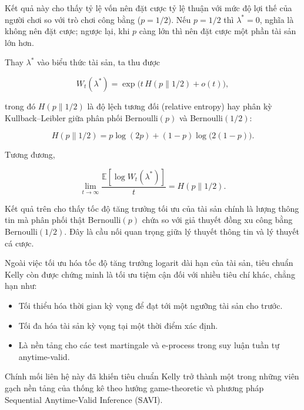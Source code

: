 Kết quả này cho thấy tỷ lệ vốn nên đặt cược tỷ lệ thuận với mức độ lợi thế của người chơi so với trò chơi công bằng ($p=1/2$). Nếu $p=1/2$ thì $\lambda^*=0$, nghĩa là không nên đặt cược; ngược lại, khi $p$ càng lớn thì nên đặt cược một phần tài sản lớn hơn.

Thay $\lambda^*$ vào biểu thức tài sản, ta thu được

\[
W_t(\lambda^*)
=
\exp
\Big(
t\,H(p\|1/2)
+
o(t)
\Big),
\]

trong đó $H(p\|1/2)$ là độ lệch tương đối (relative entropy) hay phân kỳ Kullback--Leibler giữa phân phối Bernoulli$(p)$ và Bernoulli$(1/2)$:

\[
H(p\|1/2)
=
p\log(2p)
+
(1-p)\log\big(2(1-p)\big).
\]

Tương đương,

\[
\lim_{t\to\infty}
\frac{\mathbb{E}[\log W_t(\lambda^*)]}{t}
=
H(p\|1/2).
\]

Kết quả trên cho thấy tốc độ tăng trưởng tối ưu của tài sản chính là lượng thông tin mà phân phối thật Bernoulli$(p)$ chứa so với giả thuyết đồng xu công bằng Bernoulli$(1/2)$. Đây là cầu nối quan trọng giữa lý thuyết thông tin và lý thuyết cá cược.

Ngoài việc tối ưu hóa tốc độ tăng trưởng logarit dài hạn của tài sản, tiêu chuẩn Kelly còn được chứng minh là tối ưu tiệm cận đối với nhiều tiêu chí khác, chẳng hạn như:

\begin{itemize}
    \item Tối thiểu hóa thời gian kỳ vọng để đạt tới một ngưỡng tài sản cho trước.
    \item Tối đa hóa tài sản kỳ vọng tại một thời điểm xác định.
    \item Là nền tảng cho các test martingale và e-process trong suy luận tuần tự anytime-valid.
\end{itemize}

Chính mối liên hệ này đã khiến tiêu chuẩn Kelly trở thành một trong những viên gạch nền tảng của thống kê theo hướng game-theoretic và phương pháp Sequential Anytime-Valid Inference (SAVI).